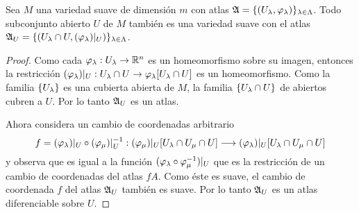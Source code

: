 \begin{ejercicio}\label{ej:22}
  Sea $M$ una variedad suave de dimensi\'on $m$ con atlas
  $\mathfrak{A}=\{(U_{\lambda},\varphi_{\lambda})\}_{\lambda\in\Lambda}$. Todo subconjunto abierto $U$ de $M$
  tambi\'en es una variedad suave con el atlas
  $\mathfrak{A}_{U}=\{(U_{\lambda}\cap U,(\varphi_{\lambda})|_{U})\}_{\lambda\in\Lambda}$.
\end{ejercicio}

\begin{proof}%
  Como cada $\varphi_{\lambda}:U_{\lambda}\rightarrow \mathbb{R}^n$ es un homeomorfismo sobre su imagen, entonces la
  restricci\'on $(\varphi_{\lambda})|_{U}: U_{\lambda}\cap U \rightarrow \varphi_{\lambda}[U_{\lambda}\cap U]$ es un
  homeomorfismo. Como la familia $\{U_{\lambda}\}$ es una cubierta abierta de $M$, la familia
  $\{U_{\lambda}\cap U\}$ de abiertos cubren a $U$. Por lo tanto $\mathfrak{A}_U$ es un atlas.

  Ahora considera un cambio de coordenadas arbitrario
  \[
    f=(\varphi_{\lambda})|_{U}\circ (\varphi_{\mu})|_{U}^{-1}:
    (\varphi_{\mu})|_{U}[U_{\lambda}\cap U_{\mu}\cap U]   \longrightarrow
    (\varphi_{\lambda})|_{U}[U_{\lambda}\cap U_{\mu}\cap U]
  \]
  y observa que es igual a la funci\'on $(\varphi_{\lambda}\circ\varphi_{\mu}^{-1})|_{U}$ que es la
  restricci\'on de un cambio de coordenadas del atlas $fA$. Como \'este es suave, el cambio de
  coordenada $f$ del atlas $\mathfrak{A}_U$ tambi\'en es suave. Por lo tanto $\mathfrak{A}_U$ es un atlas diferenciable
  sobre $U$.  
\end{proof}%

